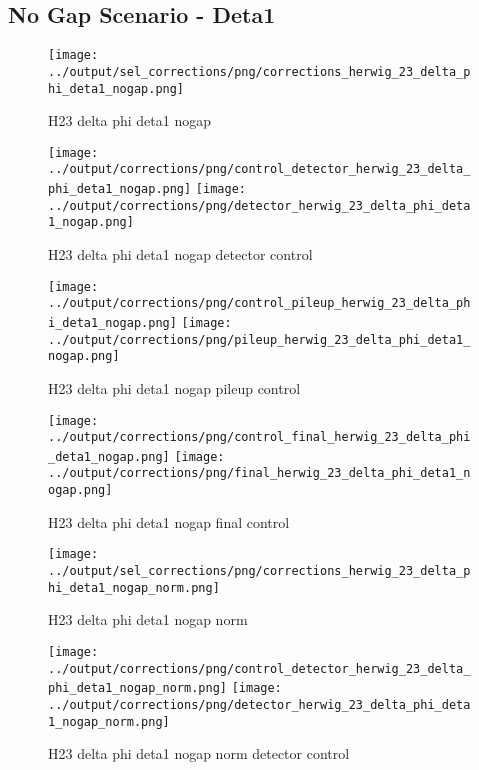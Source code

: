 \documentclass[11pt]{book}
\begin{document}
\clearpage
\subsection{No Gap Scenario - Deta1}
\begin{figure}[ht]
\centering
\texttt{[image: ../output/sel\_corrections/png/corrections\_herwig\_23\_delta\_phi\_deta1\_nogap.png]}
\caption{H23 delta phi deta1 nogap}
\label{fig:H23_delta_phi_deta1_nogap}
\end{figure}


\begin{figure}[ht]
\centering
\texttt{[image: ../output/corrections/png/control\_detector\_herwig\_23\_delta\_phi\_deta1\_nogap.png]}
\texttt{[image: ../output/corrections/png/detector\_herwig\_23\_delta\_phi\_deta1\_nogap.png]}
\caption{H23 delta phi deta1 nogap detector control}
\label{fig:H23_delta_phi_deta1_nogap_detector_control}
\end{figure}

\begin{figure}[ht]
\centering
\texttt{[image: ../output/corrections/png/control\_pileup\_herwig\_23\_delta\_phi\_deta1\_nogap.png]}
\texttt{[image: ../output/corrections/png/pileup\_herwig\_23\_delta\_phi\_deta1\_nogap.png]}
\caption{H23 delta phi deta1 nogap pileup control}
\label{fig:H23_delta_phi_deta1_nogap_pileup_control}
\end{figure}


\begin{figure}[ht]
\centering
\texttt{[image: ../output/corrections/png/control\_final\_herwig\_23\_delta\_phi\_deta1\_nogap.png]}
\texttt{[image: ../output/corrections/png/final\_herwig\_23\_delta\_phi\_deta1\_nogap.png]}
\caption{H23 delta phi deta1 nogap final control}
\label{fig:H23_delta_phi_deta1_nogap_final_control}
\end{figure}


\begin{figure}[ht]
\centering
\texttt{[image: ../output/sel\_corrections/png/corrections\_herwig\_23\_delta\_phi\_deta1\_nogap\_norm.png]}
\caption{H23 delta phi deta1 nogap norm}
\label{fig:H23_delta_phi_deta1_nogap_norm}
\end{figure}


\begin{figure}[ht]
\centering
\texttt{[image: ../output/corrections/png/control\_detector\_herwig\_23\_delta\_phi\_deta1\_nogap\_norm.png]}
\texttt{[image: ../output/corrections/png/detector\_herwig\_23\_delta\_phi\_deta1\_nogap\_norm.png]}
\caption{H23 delta phi deta1 nogap norm detector control}
\label{fig:H23_delta_phi_deta1_nogap_norm_detector_control}
\end{figure}
\end{document}
